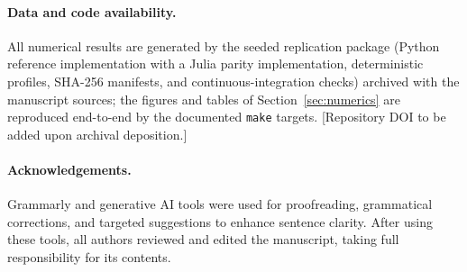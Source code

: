 \documentclass[10pt]{article}
\theoremstyle{remark}
\providecommand{\1}{\mathbf 1}
\begin{document}
\paragraph{Data and code availability.} All numerical results are generated
by the seeded replication package (Python reference implementation with a
Julia parity implementation, deterministic profiles, SHA-256 manifests, and
continuous-integration checks) archived with the manuscript sources; the
figures and tables of Section~\ref{sec:numerics} are reproduced end-to-end
by the documented \texttt{make} targets. [Repository DOI to be added upon
archival deposition.]
\paragraph{Acknowledgements.} Grammarly and generative AI tools were used
for proofreading, grammatical corrections, and targeted suggestions to
enhance sentence clarity. After using these tools, all authors reviewed and
edited the manuscript, taking full responsibility for its contents.



\end{document}
